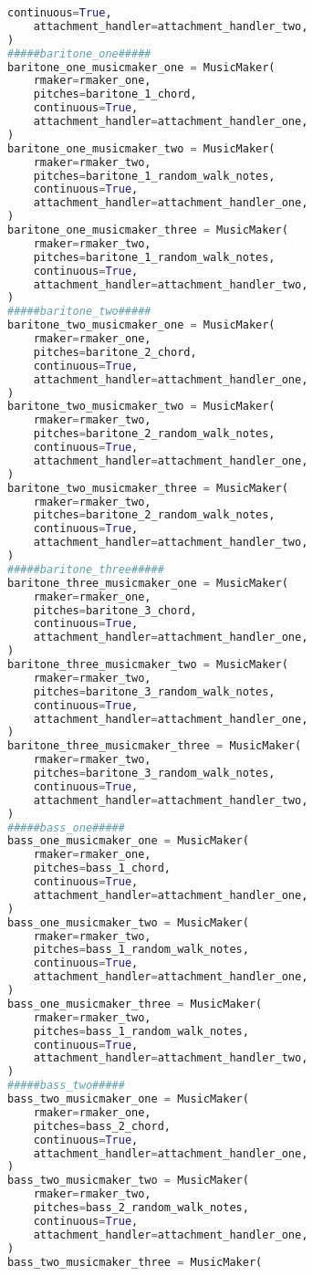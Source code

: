 \begin{lstlisting}[language=Python, caption=Invocation Source Code]
    continuous=True,
    attachment_handler=attachment_handler_two,
)
#####baritone_one#####
baritone_one_musicmaker_one = MusicMaker(
    rmaker=rmaker_one,
    pitches=baritone_1_chord,
    continuous=True,
    attachment_handler=attachment_handler_one,
)
baritone_one_musicmaker_two = MusicMaker(
    rmaker=rmaker_two,
    pitches=baritone_1_random_walk_notes,
    continuous=True,
    attachment_handler=attachment_handler_one,
)
baritone_one_musicmaker_three = MusicMaker(
    rmaker=rmaker_two,
    pitches=baritone_1_random_walk_notes,
    continuous=True,
    attachment_handler=attachment_handler_two,
)
#####baritone_two#####
baritone_two_musicmaker_one = MusicMaker(
    rmaker=rmaker_one,
    pitches=baritone_2_chord,
    continuous=True,
    attachment_handler=attachment_handler_one,
)
baritone_two_musicmaker_two = MusicMaker(
    rmaker=rmaker_two,
    pitches=baritone_2_random_walk_notes,
    continuous=True,
    attachment_handler=attachment_handler_one,
)
baritone_two_musicmaker_three = MusicMaker(
    rmaker=rmaker_two,
    pitches=baritone_2_random_walk_notes,
    continuous=True,
    attachment_handler=attachment_handler_two,
)
#####baritone_three#####
baritone_three_musicmaker_one = MusicMaker(
    rmaker=rmaker_one,
    pitches=baritone_3_chord,
    continuous=True,
    attachment_handler=attachment_handler_one,
)
baritone_three_musicmaker_two = MusicMaker(
    rmaker=rmaker_two,
    pitches=baritone_3_random_walk_notes,
    continuous=True,
    attachment_handler=attachment_handler_one,
)
baritone_three_musicmaker_three = MusicMaker(
    rmaker=rmaker_two,
    pitches=baritone_3_random_walk_notes,
    continuous=True,
    attachment_handler=attachment_handler_two,
)
#####bass_one#####
bass_one_musicmaker_one = MusicMaker(
    rmaker=rmaker_one,
    pitches=bass_1_chord,
    continuous=True,
    attachment_handler=attachment_handler_one,
)
bass_one_musicmaker_two = MusicMaker(
    rmaker=rmaker_two,
    pitches=bass_1_random_walk_notes,
    continuous=True,
    attachment_handler=attachment_handler_one,
)
bass_one_musicmaker_three = MusicMaker(
    rmaker=rmaker_two,
    pitches=bass_1_random_walk_notes,
    continuous=True,
    attachment_handler=attachment_handler_two,
)
#####bass_two#####
bass_two_musicmaker_one = MusicMaker(
    rmaker=rmaker_one,
    pitches=bass_2_chord,
    continuous=True,
    attachment_handler=attachment_handler_one,
)
bass_two_musicmaker_two = MusicMaker(
    rmaker=rmaker_two,
    pitches=bass_2_random_walk_notes,
    continuous=True,
    attachment_handler=attachment_handler_one,
)
bass_two_musicmaker_three = MusicMaker(

\end{lstlisting}
